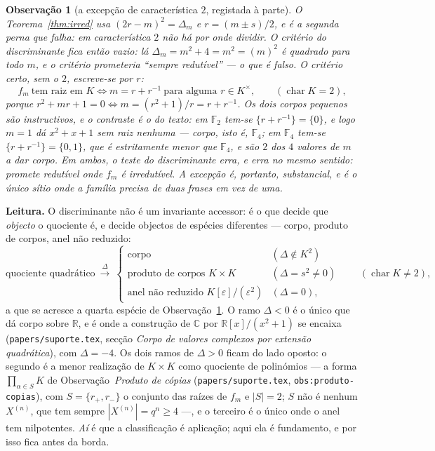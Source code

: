 \documentclass[11pt,a4paper]{article}
\newtheorem{observacao}{Observação}
\newcommand{\code}[1]{\texttt{#1}}
\begin{document}
\begin{observacao}[a excepção de característica $2$, registada à parte]\label{obs:metal-char2}
O Teorema~\ref{thm:irred} usa $(2r-m)^{2}=\Delta_m$ \emph{e} $r=(m\pm s)/2$, e é a
segunda perna que falha: em característica $2$ não há por onde dividir. O critério do
discriminante fica então \emph{vazio}: lá $\Delta_m=m^{2}+4=m^{2}=(m)^{2}$ é quadrado para
todo $m$, e o critério prometeria ``sempre redutível'' --- o que é \emph{falso}. O critério
certo, sem o $2$, escreve-se por $r$:
\[
\boxed{
f_m\ \text{tem raiz em }K
\iff
m=r+r^{-1}\ \text{para alguma }r\in K^{\times},
\qquad(\operatorname{char}K=2),
}
\]
porque $r^{2}+mr+1=0\iff m=(r^{2}+1)/r=r+r^{-1}$. Os dois corpos pequenos são
instructivos, e o contraste é o do texto: em $\mathbb{F}_2$ tem-se $\{r+r^{-1}\}=\{0\}$, e
logo $m=1$ dá $x^{2}+x+1$ sem raiz nenhuma --- \emph{corpo}, isto é, $\mathbb{F}_4$; em
$\mathbb{F}_4$ tem-se $\{r+r^{-1}\}=\{0,1\}$, que é estritamente menor que $\mathbb{F}_4$,
e são $2$ dos $4$ valores de $m$ a dar corpo. Em ambos, o teste do discriminante erra, e
erra \emph{no mesmo sentido}: promete redutível onde $f_m$ é irredutível. A excepção é,
portanto, substancial, e é o único sítio onde a família precisa de duas frases em vez de
uma.
\end{observacao}

\noindent\textbf{Leitura.} O discriminante não é um invariante accessor: é o que decide
que \emph{objecto} o quociente é, e decide objectos de espécies diferentes --- corpo,
produto de corpos, anel não reduzido:
\[
\boxed{
\text{quociente quadrático}
\ \xrightarrow{\ \Delta\ }\ 
\begin{cases}
\text{corpo} & (\Delta\notin K^{2})\\
\text{produto de corpos } K\times K & (\Delta=s^{2}\neq0)\\
\text{anel não reduzido } K[\varepsilon]/(\varepsilon^{2}) & (\Delta=0),
\end{cases}}
\qquad(\operatorname{char}K\neq2),
\]
a que se acresce a quarta espécie de Observação~\ref{obs:metal-char2}. O ramo $\Delta<0$
é o único que dá corpo sobre $\mathbb{R}$, e é onde a construção de $\mathbb{C}$ por
$\mathbb{R}[x]/(x^{2}+1)$ se encaixa (\code{papers/suporte.tex}, secção
\emph{Corpo de valores complexos por extensão quadrática}), com $\Delta=-4$. Os dois ramos
de $\Delta>0$ ficam do lado oposto: o segundo é a menor realização de $K\times K$ como
quociente de polinómios --- a forma $\prod_{\alpha\in S}K$ de
Observação~\emph{Produto de cópias} (\code{papers/suporte.tex},
\code{obs:produto-copias}), com $S=\{r_{+},r_{-}\}$ o conjunto das raízes de $f_m$ e
$|S|=2$; $S$ não é nenhum $X^{(n)}$, que tem sempre $|X^{(n)}|=q^{n}\ge4$ ---, e o
terceiro é o único onde o anel tem
nilpotentes. \emph{Aí} é que a classificação é aplicação; aqui ela é fundamento, e por isso
fica antes da borda.
\end{document}
